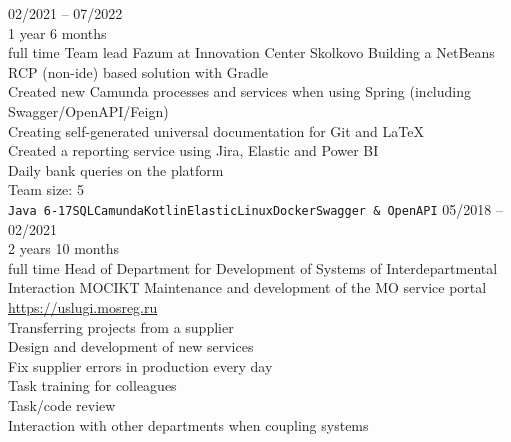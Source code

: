 


    \begin{entrylist}
        \entry
        {02/2021 -- 07/2022\\\footnotesize{1 year 6 months\\full time}}
        {Team lead}
        {Fazum at Innovation Center Skolkovo}
        {
            Building a NetBeans RCP (non-ide) based solution with Gradle \\
        Created new Camunda processes and services when using Spring (including Swagger/OpenAPI/Feign) \\
        Creating self-generated universal documentation for Git and LaTeX \\
        Created a reporting service using Jira, Elastic and Power BI \\
        Daily bank queries on the platform \\
        Team size: 5 \\
        \texttt{Java 6-17}\slashsep\texttt{SQL}\slashsep\texttt{Camunda}\slashsep\texttt{Kotlin}\slashsep\texttt{Elastic}\slashsep\texttt{Linux}\slashsep\texttt{Docker}\slashsep\texttt{Swagger \& OpenAPI}
        }
        \entry
        {05/2018 -- 02/2021\\\footnotesize{2 years 10 months\\full time}}
        {Head of Department for Development of Systems of Interdepartmental Interaction}
        {MOCIKT}
        {
            Maintenance and development of the MO service portal \url{https://uslugi.mosreg.ru} \\
            Transferring projects from a supplier \\
            Design and development of new services \\
            Fix supplier errors in production every day \\
            Task training for colleagues \\
            Task/code review \\
            Interaction with other departments when coupling systems \\
}
\end{entrylist}
